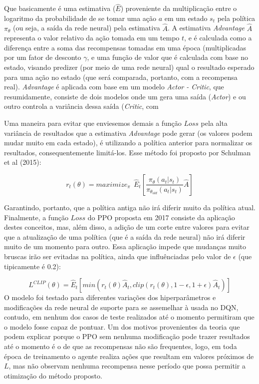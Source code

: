 \documentclass[letterpaper]{article} %
\begin{document}
Que basicamente é uma estimativa ($\hat{E}$) proveniente da multiplicação entre o logaritmo da probabilidade de se tomar uma ação $a$ em um estado $s_t$ pela política $\pi_{\theta}$ (ou seja, a saída da rede neural) pela estimativa $\hat{A}$. A estimativa \textit{Advantage} $\hat{A}$ representa o valor relativo da ação tomada em um tempo $t$, e é calculada como a diferença entre a soma das recompensas tomadas em uma época (multiplicadas por um fator de desconto $\gamma$, e uma função de valor que é calculada com base no estado, visando predizer (por meio de uma rede neural) qual o resultado esperado para uma ação no estado (que será comparada, portanto, com a recompensa real). \textit{Advantage} é aplicada com base em um modelo \textit{Actor - Critic}, que resumidamente, consiste de dois modelos onde um gera uma saída (\textit{Actor}) e ou outro controla a variância dessa saída (\textit{Critic}, com

Uma maneira para evitar que enviesemos demais a função $Loss$ pela alta variância de resultados que a estimativa \textit{Advantage} pode gerar (os valores podem mudar muito em cada estado), é utilizando a política anterior para normalizar os resultados, consequentemente limitá-los. Esse método foi proposto por Schulman et al (2015):

$$
r_t(\theta) = maximize_\pi \ \ \hat{E}_t \left[ \frac{\pi_{\theta}(a_t|s_t)}{\pi_{\theta_{old}}(a_t | s_t)} \hat{A} \right]
$$

Garantindo, portanto, que a política antiga não irá diferir muito da política atual. Finalmente, a função $Loss$ do PPO proposta em 2017 consiste da aplicação destes conceitos, mas, além disso, a adição de um corte entre valores para evitar que a atualização de uma política (que é a saída da rede neural) não irá diferir muito de um momento para outro. Essa aplicação impede que mudanças muito bruscas irão ser evitadas na política, ainda que influênciadas pelo valor de $\epsilon$ (que tipicamente é 0.2):

$$
L^{CLIP}(\theta) =  \hat{E}_t[min(r_t(\theta) \hat{A}_t, clip(r_t(\theta), 1 - \epsilon, 1 + \epsilon) \hat{A}_t)]
$$
O modelo foi testado para diferentes variações dos hiperparâmetros e modificações da rede neural de suporte para se assemelhar à usada no DQN, contudo, em nenhum dos casos de teste realizados até o momento permitiram que o modelo fosse capaz de pontuar. Um dos motivos provenientes da teoria que podem explicar porque o PPO sem nenhuma modificação pode trazer resultados até o momento é o de que as recompensas não são frequentes, logo, em toda época de treinamento o agente realiza ações que resultam em valores próximos de $L$, mas não observam nenhuma recompensa nesse período que possa permitir a otimização do método proposto. 
\end{document}
